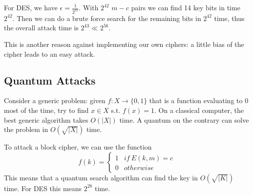 For DES, we have $\epsilon=\frac{1}{2^{21}}$. With $2^{42}$ $m-c$ pairs we can find 14 key bits in time $2^{42}$. Then we can do a brute force search for the remaining bits in $2^{42}$ time, thus the overall attack time is $2^{43}\ll 2^{56}$. 

This is another reason against implementing our own ciphers: a little bias of the cipher leads to an easy attack.
\subsection{Quantum Attacks}
Consider a generic problem: given $f:X\rightarrow\{0,1\}$ that is a function evaluating to 0 most of the time, try to find $x\in X$ s.t. $f(x)=1$. On a classical computer, the best generic algorithm takes $O(\lvert X\rvert)$ time. A quantum on the contrary can solve the problem in $O(\sqrt{\lvert X\rvert})$ time.

To attack a block cipher, we can use the function
\begin{equation*}
f(k)=\begin{cases}
1&if\:E(k,m)=c\\
0&otherwise
\end{cases}\end{equation*}
This means that a quantum search algorithm can find the key in $O(\sqrt{\lvert K\rvert})$ time. For DES this means $2^{28}$ time. 
\ifx\PREAMBLE\undefined

\fi
